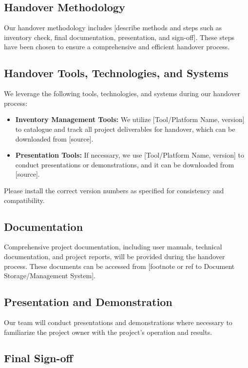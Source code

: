 \documentclass[10pt]{projectdoc}
\begin{document}
\subsection{Handover Methodology}

Our handover methodology includes [describe methods and steps such as inventory check, final documentation, presentation, and sign-off]. These steps have been chosen to ensure a comprehensive and efficient handover process.

\subsection{Handover Tools, Technologies, and Systems}

We leverage the following tools, technologies, and systems during our handover process:

\begin{itemize}
\item \textbf{Inventory Management Tools:} We utilize [Tool/Platform Name, version] to catalogue and track all project deliverables for handover, which can be downloaded from [source].
\item \textbf{Presentation Tools:} If necessary, we use [Tool/Platform Name, version] to conduct presentations or demonstrations, and it can be downloaded from [source].
\end{itemize}

Please install the correct version numbers as specified for consistency and compatibility.


\subsection{Documentation}

Comprehensive project documentation, including user manuals, technical documentation, and project reports, will be provided during the handover process. These documents can be accessed from [footnote or ref to Document Storage/Management System].

\subsection{Presentation and Demonstration}

Our team will conduct presentations and demonstrations where necessary to familiarize the project owner with the project's operation and results.

\subsection{Final Sign-off}
\end{document}
